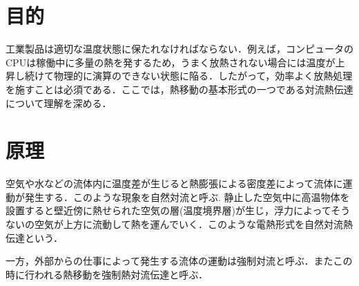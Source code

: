 \documentclass[a4paper,11pt,uplatex]{jsarticle}
\begin{document}
\section{目的}
工業製品は適切な温度状態に保たれなければならない．例えば，コンピュータのCPUは稼働中に多量の熱を発するため，うまく放熱されない場合には温度が上昇し続けて物理的に演算のできない状態に陥る．したがって，効率よく放熱処理を施すことは必須である．ここでは，熱移動の基本形式の一つである対流熱伝達について理解を深める．
\section{原理}
空気や水などの流体内に温度差が生じると熱膨張による密度差によって流体に運動が発生する．このような現象を自然対流と呼ぶ.
静止した空気中に高温物体を設置すると壁近傍に熱せられた空気の層(温度境界層)が生じ，浮力によってそうないの空気が上方に流動して熱を運んでいく．このような電熱形式を自然対流熱伝達という．
\par
一方，外部からの仕事によって発生する流体の運動は強制対流と呼ぶ．またこの時に行われる熱移動を強制熱対流伝達と呼ぶ．
\end{document}
